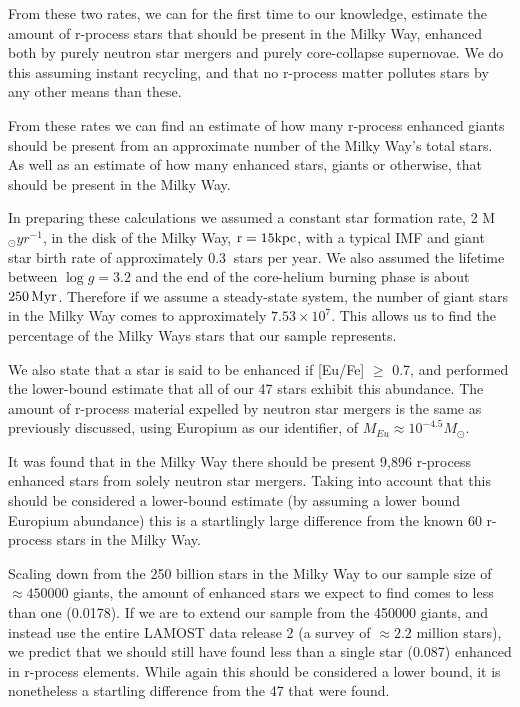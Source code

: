 \documentclass[a4paper,fleqn,usenatbib]{mnras}
\begin{document}
	From these two rates, we can for the first time to our knowledge, estimate the amount of r-process stars that should be present in the Milky Way, enhanced both by purely neutron star mergers and purely core-collapse supernovae. We do this assuming instant recycling, and that no r-process matter pollutes stars by any other means than these.
	
	From these rates we can find an estimate of how many r-process enhanced giants should be present from an approximate number of the Milky Way's total stars. As well as an estimate of how many enhanced stars, giants or otherwise, that should be present in the Milky Way.
	
	In preparing these calculations we assumed a constant star formation rate, 2 M$_\odot yr^{-1}$, in the disk of the Milky Way, $\rm{r=15kpc}$, with a typical IMF and giant star birth rate of approximately $0.3\ $ stars per year. We also assumed the lifetime between $\log{g} = 3.2$ and the end of the core-helium burning phase is about $250\,{\rm Myr}$. Therefore if we assume a steady-state system, the number of giant stars in the Milky Way comes to approximately $7.53\times10^7$. This allows us to find the percentage of the Milky Ways stars that our sample represents.
	
	We also state that a star is said to be enhanced if [Eu/Fe] $\geq$ 0.7, and performed the lower-bound estimate that all of our 47 stars exhibit this abundance. The amount of r-process material expelled by neutron star mergers is the same as previously discussed, using Europium as our identifier, of $M_{Eu}\approx10^{-4.5} M_{\odot}$.
	
    It was found that in the Milky Way there should be present 9,896 r-process enhanced stars from solely neutron star mergers. Taking into account that this should be considered a lower-bound estimate (by assuming a lower bound Europium abundance) this is a startlingly large difference from the known 60 r-process stars in the Milky Way.
    
    Scaling down from the 250 billion stars in the Milky Way to our sample size of $\approx450000$ giants, the amount of enhanced stars we expect to find comes to less than one (0.0178). If we are to extend our sample from the 450000 giants, and instead use the entire LAMOST data release 2 (a survey of $\approx2.2$ million stars), we predict that we should still have found less than a single star (0.087) enhanced in r-process elements. While again this should be considered a lower bound, it is nonetheless a startling difference from the 47 that were found.
    
\end{document}
